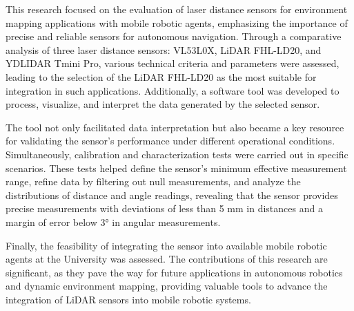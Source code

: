 This research focused on the evaluation of laser distance sensors for environment mapping applications with mobile robotic agents, emphasizing the importance of precise and reliable sensors for autonomous navigation. Through a comparative analysis of three laser distance sensors: VL53L0X, LiDAR FHL-LD20, and YDLIDAR Tmini Pro, various technical criteria and parameters were assessed, leading to the selection of the LiDAR FHL-LD20 as the most suitable for integration in such applications. Additionally, a software tool was developed to process, visualize, and interpret the data generated by the selected sensor.

The tool not only facilitated data interpretation but also became a key resource for validating the sensor’s performance under different operational conditions. Simultaneously, calibration and characterization tests were carried out in specific scenarios. These tests helped define the sensor's minimum effective measurement range, refine data by filtering out null measurements, and analyze the distributions of distance and angle readings, revealing that the sensor provides precise measurements with deviations of less than 5 mm in distances and a margin of error below 3° in angular measurements.

Finally, the feasibility of integrating the sensor into available mobile robotic agents at the University was assessed. The contributions of this research are significant, as they pave the way for future applications in autonomous robotics and dynamic environment mapping, providing valuable tools to advance the integration of LiDAR sensors into mobile robotic systems.